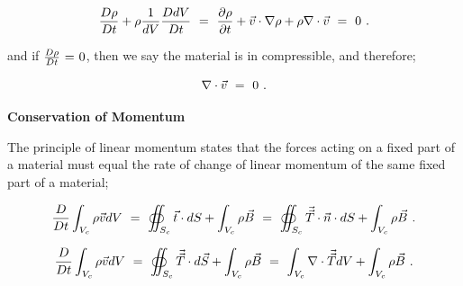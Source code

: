 \documentclass{article}
\begin{document}
\begin{equation} \label{eb-eq-1-126}
\frac{D \rho}{D t} + \rho \frac{1}{dV} \frac{D dV}{D t} \hspace{0.125cm} = \hspace{0.125cm} \frac{\partial{\rho}}{\partial{t}} + \vec{v} \cdot \nabla{\rho} + \rho \nabla \cdot \vec{v} \hspace{0.125cm} = \hspace{0.125cm} 0 \hspace{0.125cm}  . 
\end{equation} 

and if \begin{math} \frac{D \rho}{D t} \hspace{0.025cm} = \hspace{0.025cm} 0 \end{math}, then we say the material is in compressible, and therefore;

\begin{equation} \label{eb-eq-1-127}
\nabla \cdot \vec{v} \hspace{0.125cm} = \hspace{0.125cm} 0 \hspace{0.125cm}  . 
\end{equation} 

\vspace{0.5cm}

\textbf{Conservation of Momentum}

The principle of linear momentum states that the forces acting on a fixed part of a material must equal the rate of change of linear momentum of the same fixed part of a material;

\begin{equation} \label{eb-eq-1-128}
\frac{D}{D t} \int_{V_c} \rho \vec{v} dV \hspace{0.125cm} = \hspace{0.125cm} \oiint_{S_c} \vec{t} \cdot dS + \int_{V_c} \rho \vec{B} \hspace{0.125cm} = \hspace{0.125cm} \oiint_{S_c} \vec{\vec{T}} \cdot \vec{n} \cdot dS + \int_{V_c} \rho \vec{B} \hspace{0.125cm}  . 
\end{equation}  

\begin{equation} \label{eb-eq-1-129}
\frac{D}{D t} \int_{V_c} \rho \vec{v} dV \hspace{0.125cm} = \hspace{0.125cm} \oiint_{S_c} \vec{\vec{T}} \cdot d \vec{S} + \int_{V_c} \rho \vec{B} \hspace{0.125cm} = \hspace{0.125cm} \int_{V_c} \nabla \cdot \vec{\vec{T}} dV + \int_{V_c} \rho \vec{B} \hspace{0.125cm}  . 
\end{equation} 
\end{document}
